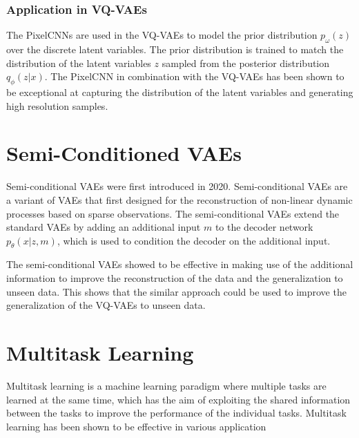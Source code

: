 \subsubsection{Application in VQ-VAEs}

The PixelCNNs are used in the VQ-VAEs to model the prior distribution $p_{\omega}(z)$ over the discrete latent variables. The prior distribution is trained to match the distribution of the latent variables $z$ sampled from the posterior distribution $q_{\phi}(z|x)$. The PixelCNN in combination with the VQ-VAEs has been shown to be exceptional at capturing the distribution of the latent variables and generating high resolution samples.\cite{vqvae}

\section{Semi-Conditioned VAEs}

Semi-conditional VAEs were first introduced in 2020.\cite{Gundersen_2021} Semi-conditional VAEs are a variant of VAEs that first designed for the reconstruction of non-linear dynamic processes based on sparse observations. The semi-conditional VAEs extend the standard VAEs by adding an additional input $m$ to the decoder network $p_{\theta}(x|z, m)$, which is used to condition the decoder on the additional input. 

The semi-conditional VAEs showed to be effective in making use of the additional information to improve the reconstruction of the data and the generalization to unseen data.\cite{Gundersen_2021} This shows that the similar approach could be used to improve the generalization of the VQ-VAEs to unseen data.

\section{Multitask Learning}

Multitask learning is a machine learning paradigm where multiple tasks are learned at the same time, which has the aim of exploiting the shared information between the tasks to improve the performance of the individual tasks. Multitask learning has been shown to be effective in various application









